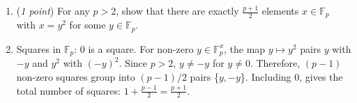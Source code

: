 \documentclass[11pt]{article}
\newcommand{\bbF}{\mathbb{F}}
\theoremstyle{definition}
\numberwithin{equation}{subsection}
\begin{document}
\begin{enumerate}
\begin{enumerate}
\item (\emph{1 point}) For any $p > 2$, show that there are exactly $\frac{p+1}{2}$ elements $x\in \mathbb{F}_p$ with $x=y^2$ for some $y \in \mathbb{F}_p$.
\item[] Squares in $\bbF _p$: 0 is a square. For non-zero $y\in \bbF ^x _p$, the map $y\mapsto y^2$ pairs $y$ with $-y$ and $y^2$ with $(-y)^2$. Since $p>2$, $y\neq-y$ for $y\neq0$. Therefore, $(p-1)$ non-zero squares group into $(p-1)/2$ pairs \{$y,-y$\}. Including 0, gives the total number of squares: $1+\frac{p-1}{2}=\frac{p+1}{2}$.
\end{enumerate}


\end{enumerate}
\end{document}
